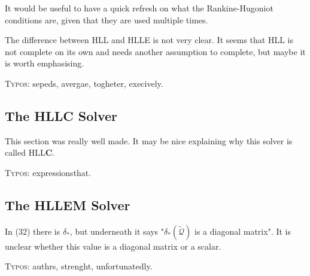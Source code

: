 \documentclass{scrartcl}
\begin{document}
It would be useful to have a quick refresh on what the Rankine-Hugoniot conditions are, given that they are used multiple times. 

The difference between HLL and HLLE is not very clear. It seems that HLL is not complete on its own and needs another assumption to complete, but maybe it is worth emphasising. 

\textsc{Typos}: sepeds, avergae, togheter, execively.

\subsection{The HLLC Solver}

This section was really well made. It may be nice explaining why this solver is called HLL\textbf{C}.

\textsc{Typos}: expressionsthat.

\subsection{The HLLEM Solver}

In (32) there is $\delta_*$, but underneath it says "$\delta_*(\tilde{\mathcal{Q}})$ is a diagonal matrix". It is unclear whether this value is a diagonal matrix or a scalar.

\textsc{Typos}: authrs, strenght, unfortunatedly.
\end{document}
